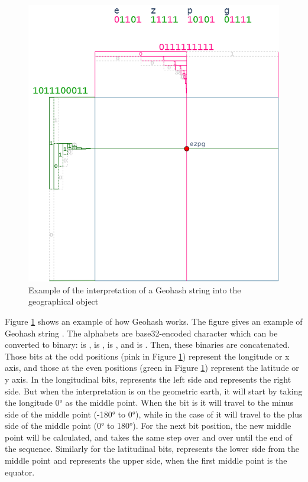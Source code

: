 \begin{figure}[htb!]
  \centering
  \includegraphics[width=\textwidth]{images/BackgroundGeohash.png}
  \caption{Example of the interpretation of a Geohash string into the geographical object}
  \label{fig:BackgroundGeohash}
\end{figure}

\npara Figure \ref{fig:BackgroundGeohash} shows an example of how Geohash works.
The figure gives an example of Geohash string .
The alphabets are base32-encoded character which can be converted to binary:  is ,  is ,  is , and  is .
Then, these binaries are concatenated.
Those bits at the odd positions (pink in Figure \ref{fig:BackgroundGeohash}) represent the longitude or x axis, and those at the even positions (green in Figure \ref{fig:BackgroundGeohash}) represent the latitude or y axis.
In the longitudinal bits,  represents the left side and  represents the right side.
But when the interpretation is on the geometric earth, it will start by taking the longitude 0° as the middle point.
When the bit is  it will travel to the minus side of the middle point (-180° to 0°), while in the case of  it will travel to the plus side of the middle point (0° to 180°).
For the next bit position, the new middle point will be calculated, and takes the same step over and over until the end of the sequence.
Similarly for the latitudinal bits,  represents the lower side from the middle point and  represents the upper side, when the first middle point is the equator.

